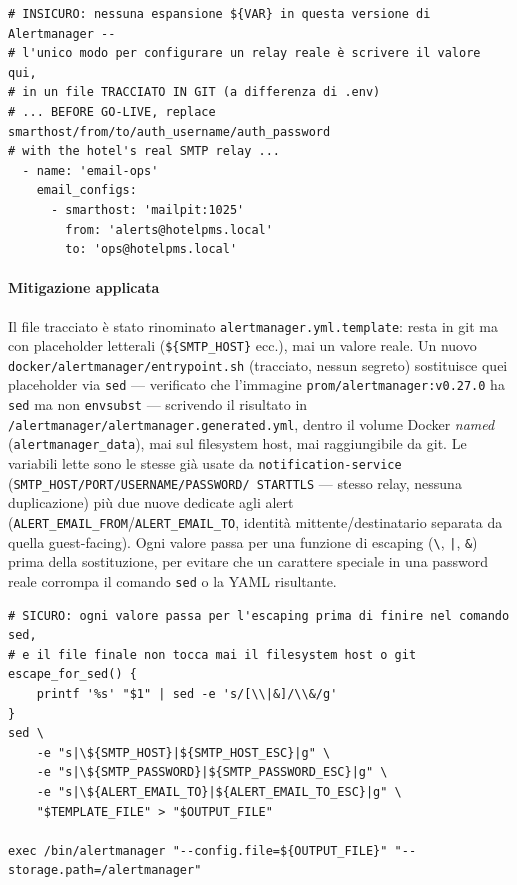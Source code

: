 ﻿\documentclass[a4paper,12pt]{report}
\begin{document}
\begin{insecurebox}[title={docker/alertmanager/alertmanager.yml --- commento che invita al leak (baseline)}]
\begin{lstlisting}[style=yaml]
# INSICURO: nessuna espansione ${VAR} in questa versione di Alertmanager --
# l'unico modo per configurare un relay reale è scrivere il valore qui,
# in un file TRACCIATO IN GIT (a differenza di .env)
# ... BEFORE GO-LIVE, replace smarthost/from/to/auth_username/auth_password
# with the hotel's real SMTP relay ...
  - name: 'email-ops'
    email_configs:
      - smarthost: 'mailpit:1025'
        from: 'alerts@hotelpms.local'
        to: 'ops@hotelpms.local'
\end{lstlisting}
\end{insecurebox}

\paragraph{Mitigazione applicata}
Il file tracciato è stato rinominato \texttt{alertmanager.yml.template}:
resta in git ma con placeholder letterali (\texttt{\$\{SMTP\_HOST\}} ecc.),
mai un valore reale. Un nuovo \texttt{docker/alertmanager/entrypoint.sh}
(tracciato, nessun segreto) sostituisce quei placeholder via \texttt{sed}
--- verificato che l'immagine \texttt{prom/alertmanager:v0.27.0} ha
\texttt{sed} ma non \texttt{envsubst} --- scrivendo il risultato in
\texttt{/alertmanager/alertmanager.generated.yml}, dentro il volume Docker
\emph{named} (\texttt{alertmanager\_data}), mai sul filesystem host, mai
raggiungibile da git. Le variabili lette sono le stesse già usate da
\texttt{notification-service} (\texttt{SMTP\_HOST/PORT/USERNAME/PASSWORD/
STARTTLS} --- stesso relay, nessuna duplicazione) più due nuove dedicate
agli alert (\texttt{ALERT\_EMAIL\_FROM}/\texttt{ALERT\_EMAIL\_TO}, identità
mittente/destinatario separata da quella guest-facing). Ogni valore passa
per una funzione di escaping (\texttt{\textbackslash}, \texttt{|}, \texttt{\&}) prima della
sostituzione, per evitare che un carattere speciale in una password reale
corrompa il comando \texttt{sed} o la YAML risultante.

\begin{securebox}[title={docker/alertmanager/entrypoint.sh --- escaping e sostituzione (fix)}]
\begin{lstlisting}[style=bash]
# SICURO: ogni valore passa per l'escaping prima di finire nel comando sed,
# e il file finale non tocca mai il filesystem host o git
escape_for_sed() {
    printf '%s' "$1" | sed -e 's/[\\|&]/\\&/g'
}
sed \
    -e "s|\${SMTP_HOST}|${SMTP_HOST_ESC}|g" \
    -e "s|\${SMTP_PASSWORD}|${SMTP_PASSWORD_ESC}|g" \
    -e "s|\${ALERT_EMAIL_TO}|${ALERT_EMAIL_TO_ESC}|g" \
    "$TEMPLATE_FILE" > "$OUTPUT_FILE"

exec /bin/alertmanager "--config.file=${OUTPUT_FILE}" "--storage.path=/alertmanager"
\end{lstlisting}
\end{securebox}
\end{document}
